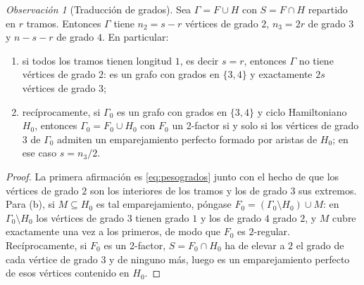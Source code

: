 \documentclass[11pt,a4paper]{article}
\theoremstyle{definition}
\theoremstyle{remark}
\newtheorem{observacion}[teorema]{Observación}
\begin{document}
\begin{observacion}[Traducción de grados]\label{obs:traduccion}
Sea $\Gamma=F\cup H$ con $S=F\cap H$ repartido en $r$ tramos. Entonces $\Gamma$ tiene $n_2=s-r$ vértices de grado $2$, $n_3=2r$ de grado $3$ y $n-s-r$ de grado $4$. En particular:
\begin{enumerate}[label=(\alph*)]
\item si todos los tramos tienen longitud $1$, es decir $s=r$, entonces $\Gamma$ no tiene vértices de grado $2$: es un grafo con grados en $\{3,4\}$ y exactamente $2s$ vértices de grado $3$;
\item recíprocamente, si $\Gamma_0$ es un grafo con grados en $\{3,4\}$ y ciclo Hamiltoniano $H_0$, entonces $\Gamma_0=F_0\cup H_0$ con $F_0$ un 2-factor si y solo si los vértices de grado $3$ de $\Gamma_0$ admiten un emparejamiento perfecto formado por aristas de $H_0$; en ese caso $s=n_3/2$.
\end{enumerate}
\end{observacion}

\begin{proof}
La primera afirmación es \eqref{eq:pesogrados} junto con el hecho de que los vértices de grado $2$ son los interiores de los tramos y los de grado $3$ sus extremos. Para (b), si $M\subseteq H_0$ es tal emparejamiento, póngase $F_0=(\Gamma_0\setminus H_0)\cup M$: en $\Gamma_0\setminus H_0$ los vértices de grado $3$ tienen grado $1$ y los de grado $4$ grado $2$, y $M$ cubre exactamente una vez a los primeros, de modo que $F_0$ es $2$-regular. Recíprocamente, si $F_0$ es un 2-factor, $S=F_0\cap H_0$ ha de elevar a $2$ el grado de cada vértice de grado $3$ y de ninguno más, luego es un emparejamiento perfecto de esos vértices contenido en $H_0$.
\end{proof}
\end{document}

